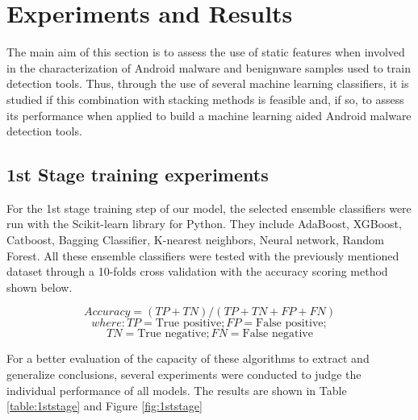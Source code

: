 \chapter{Experiments and Results}

The main aim of this section is to assess the use of static features when involved in the characterization of Android malware and benignware samples used to train detection tools. Thus, through
the use of several machine learning classifiers, it is studied if this combination with stacking methods is feasible and, if
so, to assess its performance when applied to build a machine learning aided Android malware
detection tools.

\section{1st Stage training experiments} \label{1ststagetrain}

For the 1st stage training step of our model, the selected ensemble classifiers were run with the Scikit-learn library for Python\cite{scikitlearn}.
They include AdaBoost, XGBoost, Catboost, Bagging Classifier, K-nearest neighbors, Neural network, Random Forest. 
All these ensemble classifiers were tested with the previously mentioned dataset through a 10-folds cross validation with the accuracy scoring method shown below.

$$Accuracy = (TP+TN)/(TP+TN+FP+FN)$$
$$where: TP = \text{True positive}; FP = \text{False positive};$$$$TN = \text{True negative}; FN = \text{False negative}$$

For a better evaluation of the capacity of these algorithms to extract
and generalize conclusions, several experiments were conducted to judge the individual performance of all models.
The results are shown in Table \ref{table:1ststage} and Figure \ref{fig:1ststage}

